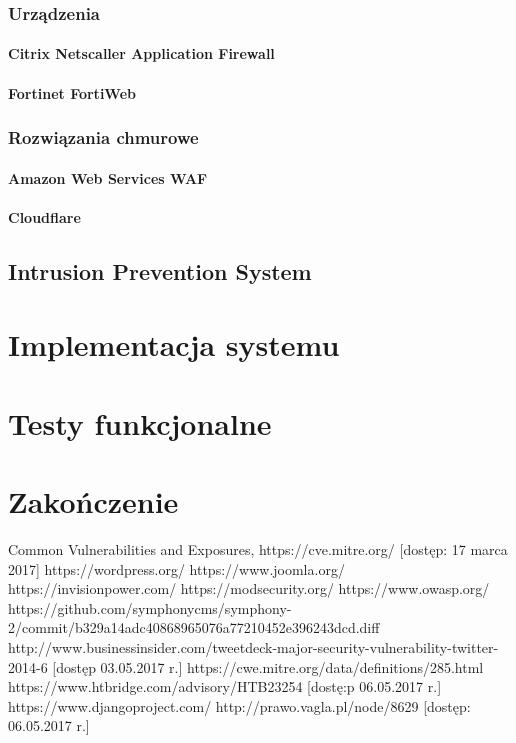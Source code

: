 \documentclass[11pt,a4paper,polish,thesis,oneside]{dcsbook}
\begin{document}
\subsection{Urządzenia}
\subsubsection{Citrix Netscaller Application Firewall}
\subsubsection{Fortinet FortiWeb}

\subsection{Rozwiązania chmurowe}
\subsubsection{Amazon Web Services WAF}
\subsubsection{Cloudflare}

\section{Intrusion Prevention System}

\chapter{Implementacja systemu}

\chapter{Testy funkcjonalne}


\chapter{Zakończenie}

\backmatter

\begin{thebibliography}{1}
 Common Vulnerabilities and Exposures, https://cve.mitre.org/ [dostęp: 17 marca 2017]
 https://wordpress.org/
 https://www.joomla.org/
 https://invisionpower.com/
 https://modsecurity.org/
 https://www.owasp.org/
 https://github.com/symphonycms/symphony-2/commit/b329a14adc40868965076a77210452e396243dcd.diff
 http://www.businessinsider.com/tweetdeck-major-security-vulnerability-twitter-2014-6 [dostęp 03.05.2017 r.]
 https://cwe.mitre.org/data/definitions/285.html
 https://www.htbridge.com/advisory/HTB23254 [dostę:p 06.05.2017 r.]
 https://www.djangoproject.com/
 http://prawo.vagla.pl/node/8629 [dostęp: 06.05.2017 r.]
\end{thebibliography}
\end{document}
